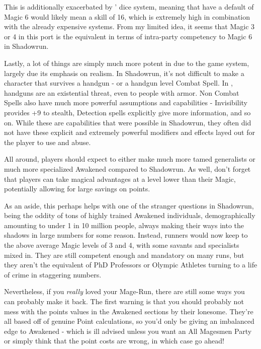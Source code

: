 \begin{multicols}{2}
	This is additionally exacerbated by \GURPS' dice system, meaning that have a default of Magic 6 would likely mean a skill of 16, which is extremely high in combination with the already expensive systems. From my limited idea, it seems that Magic 3 or 4 in this port is the equivalent in terms of intra-party competency to Magic 6 in Shadowrun.
	
	Lastly, a lot of things are simply much more potent in \GURPS due to the game system, largely due its emphasis on realism. In Shadowrun, it's not difficult to make a character that survives a handgun - or a handgun level Combat Spell. In \GURPS, handguns are an existential threat, even to people with armor. Non Combat Spells also have much more powerful assumptions and capabilities - Invisibility provides +9 to stealth, Detection spells explicitly give more information, and so on. While these are capabilities that were possible in Shadowrun, they often did not have these explicit and extremely powerful modifiers and effects layed out for the player to use and abuse.
	
	All around, players should expect to either make much more tamed generalists or much more specialized Awakened compared to Shadowrun. As well, don't forget that players can take magical advantages at a level lower than their Magic, potentially allowing for large savings on points.
	
	As an aside, this perhaps helps with one of the stranger questions in Shadowrun, being the oddity of tons of highly trained Awakened individuals, demographically amounting to under 1 in 10 million people, always making their ways into the shadows in large numbers for some reason. Instead, runners would now keep to the above average Magic levels of 3 and 4, with some savants and specialists mixed in. They are still competent enough and mandatory on many runs, but they aren't the equivalent of PhD Professors or Olympic Athletes turning to a life of crime in staggering numbers.
	
	Nevertheless, if you \textit{really} loved your Mage-Run, there are still some ways you can probably make it back. The first warning is that you should probably not mess with the points values in the Awakened sections by their lonesome. They're all based off of genuine \GURPS Point calculations, so you'd only be giving an imbalanced edge to Awakened - which is ill advised unless you want an All Magesmen Party or simply think that the point costs are wrong, in which case go ahead! 
	

\end{multicols}
